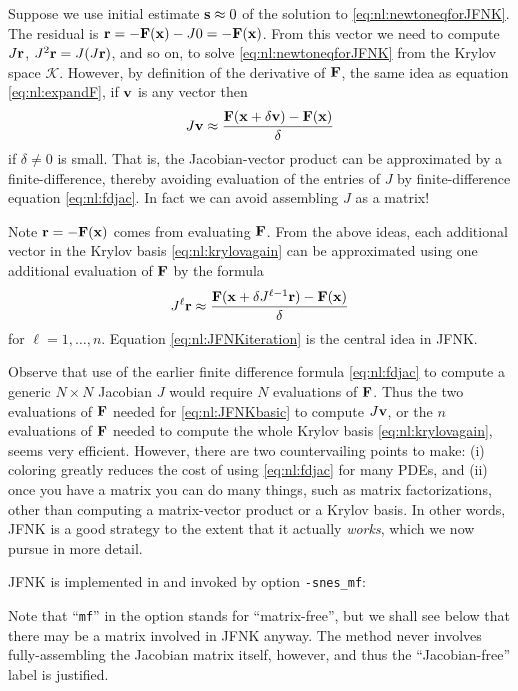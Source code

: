 Suppose we use initial estimate $\mathbf{s}\approx 0$ \citep{KnollKeyes2004} of the solution to \eqref{eq:nl:newtoneqforJFNK}.  The residual is $\mathbf{r} = - \mathbf{F}(\mathbf{x}) - J 0 = - \mathbf{F}(\mathbf{x})$.  From this vector we need to compute $J\mathbf{r}$, $J^2\mathbf{r}=J(J\mathbf{r})$, and so on, to solve \eqref{eq:nl:newtoneqforJFNK} from the Krylov space $\mathcal{K}$.  However, by definition of the derivative of $\mathbf{F}$, the same idea as equation \eqref{eq:nl:expandF}, if $\mathbf{v}$ is any vector then
\begin{equation}
J \mathbf{v} \approx \frac{\mathbf{F}(\mathbf{x}+\delta \mathbf{v}) - \mathbf{F}(\mathbf{x})}{\delta} \label{eq:nl:JFNKbasic}
\end{equation}
if $\delta \ne 0$ is small.  That is, the Jacobian-vector product can be approximated by a finite-difference, thereby avoiding evaluation of the entries of $J$ by finite-difference equation \eqref{eq:nl:fdjac}. In fact we can avoid assembling $J$ as a matrix!

Note $\mathbf{r} = - \mathbf{F}(\mathbf{x})$ comes from evaluating $\mathbf{F}$.  From the above ideas, each additional vector in the Krylov basis \eqref{eq:nl:krylovagain} can be approximated using one additional evaluation of $\mathbf{F}$ by the formula
\begin{equation}
J^{\ell} \mathbf{r} \approx \frac{\mathbf{F}(\mathbf{x}+\delta J^{\ell-1}\mathbf{r}) - \mathbf{F}(\mathbf{x})}{\delta} \label{eq:nl:JFNKiteration}
\end{equation}
for $\ell=1,\dots,n$.  Equation \eqref{eq:nl:JFNKiteration} is the central idea in JFNK.

Observe that use of the earlier finite difference formula \eqref{eq:nl:fdjac} to compute a generic $N\times N$ Jacobian $J$ would require $N$ evaluations of $\mathbf{F}$.  Thus the two evaluations of $\mathbf{F}$ needed for \eqref{eq:nl:JFNKbasic} to compute $J\mathbf{v}$, or the $n$ evaluations of $\mathbf{F}$ needed to compute the whole Krylov basis \eqref{eq:nl:krylovagain}, seems very efficient.  However, there are two countervailing points to make: (i) coloring greatly reduces the cost of using \eqref{eq:nl:fdjac} for many PDEs, and (ii) once you have a matrix you can do many things, such as matrix factorizations, other than computing a matrix-vector product or a Krylov basis.  In other words, JFNK is a good strategy to the extent that it actually \emph{works}, which we now pursue in more detail.

JFNK is implemented in \PETSc and invoked by option \texttt{-snes\_mf}:
Note that ``\texttt{mf}'' in the option stands for ``matrix-free'', but we shall see below that there may be a matrix involved in JFNK anyway.  The method never involves fully-assembling the Jacobian matrix itself, however, and thus the ``Jacobian-free'' label is justified.

